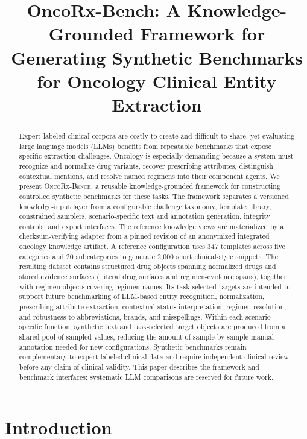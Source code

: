 \documentclass[conference]{IEEEtran}
\title{OncoRx-Bench: A Knowledge-Grounded Framework for
Generating Synthetic Benchmarks for Oncology Clinical Entity Extraction}
\author{\IEEEauthorblockN{Anonymous Authors}
\IEEEauthorblockA{Anonymous Institution}}
\author{\IEEEauthorblockN{Abhishek Shivanna, Jordan Tschida, Mayanka Chandrashekar,\\
John Gounley, and Heidi A. Hanson}
\IEEEauthorblockA{Computational Sciences and Engineering Division\\
Oak Ridge National Laboratory}}
\newcommand{\dataset}{\textsc{OncoRx-Bench}}
\newcommand{\kbfull}{an anonymized integrated oncology knowledge artifact}
\newcommand{\kbfull}{the Unified Oncology Treatment Database (UOTD)}
\begin{document}
\maketitle

\begin{abstract}
Expert-labeled clinical corpora are costly to create and difficult to share,
yet evaluating large language models (LLMs) benefits from repeatable benchmarks
that expose specific extraction challenges. Oncology is especially demanding
because a
system must recognize and normalize drug variants, recover prescribing
attributes, distinguish contextual mentions, and resolve named regimens into
their component agents. We present \dataset, a reusable knowledge-grounded
framework for constructing controlled synthetic benchmarks for these tasks.
The framework separates a versioned knowledge-input layer from a configurable
challenge taxonomy, template library, constrained samplers, scenario-specific
text and annotation generation, integrity controls, and
export interfaces. The reference knowledge views are materialized by a
checksum-verifying adapter from a pinned revision of \kbfull{}. A reference
configuration uses 347 templates across five categories and 20 subcategories to
generate 2,000 short clinical-style snippets. The resulting dataset contains
\FinalDrugObjects{} structured drug objects spanning
\FinalUniqueDrugs{} normalized drugs and
\FinalUniqueEvidenceSurfaces{} stored evidence surfaces
(\FinalUniqueExplicitSurfaces{} literal drug surfaces and
\FinalUniqueInferenceSurfaces{} regimen-evidence spans), together with
\FinalRegimenObjects{} regimen objects covering
\FinalUniqueRegimens{} regimen names. Its
task-selected targets are intended to support future benchmarking of LLM-based
entity recognition, normalization, prescribing-attribute extraction,
contextual status interpretation, regimen resolution, and robustness to
abbreviations, brands, and misspellings. Within each scenario-specific
function, synthetic text and task-selected target objects are produced from a
shared pool of sampled values, reducing the amount of sample-by-sample manual
annotation needed for new configurations. Synthetic benchmarks remain
complementary to
expert-labeled clinical data and require independent clinical review before any
claim of clinical validity. This paper describes the framework and benchmark
interfaces; systematic LLM comparisons are reserved for future work.
\end{abstract}

\section{Introduction}
\label{sec:introduction}
\end{document}
